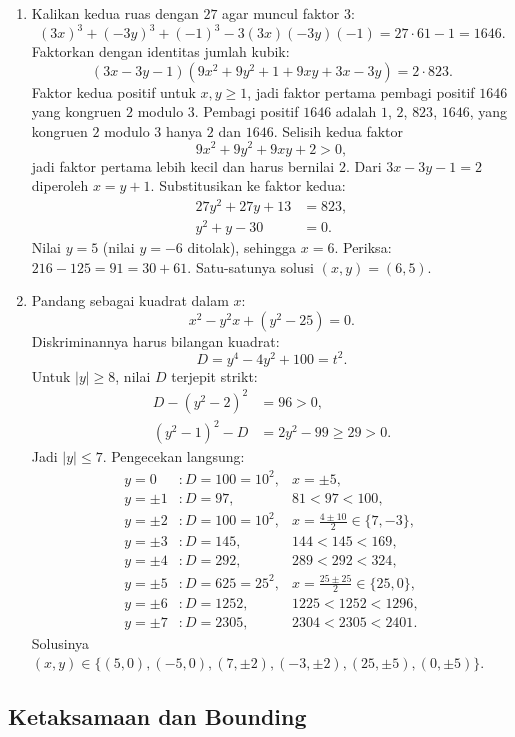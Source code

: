 \documentclass[12pt]{scrartcl}
\begin{document}
\begin{enumerate}
	\item Kalikan kedua ruas dengan $27$ agar muncul faktor $3$:
	\[ (3x)^3 + (-3y)^3 + (-1)^3 - 3(3x)(-3y)(-1) = 27 \cdot 61 - 1 = 1646. \]
	Faktorkan dengan identitas jumlah kubik:
	\[ (3x - 3y - 1)(9x^2 + 9y^2 + 1 + 9xy + 3x - 3y) = 2 \cdot 823. \]
	Faktor kedua positif untuk $x, y \ge 1$,
	jadi faktor pertama pembagi positif $1646$ yang kongruen $2$ modulo $3$.
	Pembagi positif $1646$ adalah $1$, $2$, $823$, $1646$,
	yang kongruen $2$ modulo $3$ hanya $2$ dan $1646$.
	Selisih kedua faktor
	\[ 9x^2 + 9y^2 + 9xy + 2 > 0, \]
	jadi faktor pertama lebih kecil dan harus bernilai $2$.
	Dari $3x - 3y - 1 = 2$ diperoleh $x = y + 1$.
	Substitusikan ke faktor kedua:
	\begin{align*}
	27y^2 + 27y + 13 &= 823, \\
	y^2 + y - 30 &= 0.
	\end{align*}
	Nilai $y = 5$ (nilai $y = -6$ ditolak), sehingga $x = 6$.
	Periksa: $216 - 125 = 91 = 30 + 61$.
	Satu-satunya solusi $(x, y) = (6, 5)$.

	\item Pandang sebagai kuadrat dalam $x$:
	\[ x^2 - y^2x + (y^2 - 25) = 0. \]
	Diskriminannya harus bilangan kuadrat:
	\[ D = y^4 - 4y^2 + 100 = t^2. \]
	Untuk $|y| \ge 8$, nilai $D$ terjepit strikt:
	\begin{align*}
	D - (y^2 - 2)^2 &= 96 > 0, \\
	(y^2 - 1)^2 - D &= 2y^2 - 99 \ge 29 > 0.
	\end{align*}
	Jadi $|y| \le 7$. Pengecekan langsung:
	\begin{align*}
	y = 0 &: D = 100 = 10^2, & x = \pm 5, \\
	y = \pm 1 &: D = 97, & 81 < 97 < 100, \\
	y = \pm 2 &: D = 100 = 10^2, & x = \frac{4 \pm 10}{2} \in \{7, -3\}, \\
	y = \pm 3 &: D = 145, & 144 < 145 < 169, \\
	y = \pm 4 &: D = 292, & 289 < 292 < 324, \\
	y = \pm 5 &: D = 625 = 25^2, & x = \frac{25 \pm 25}{2} \in \{25, 0\}, \\
	y = \pm 6 &: D = 1252, & 1225 < 1252 < 1296, \\
	y = \pm 7 &: D = 2305, & 2304 < 2305 < 2401.
	\end{align*}
	Solusinya $(x, y) \in \{(5, 0), (-5, 0), (7, \pm 2), (-3, \pm 2),
	(25, \pm 5), (0, \pm 5)\}$.
\end{enumerate}

\subsection{Ketaksamaan dan Bounding}
\end{document}
